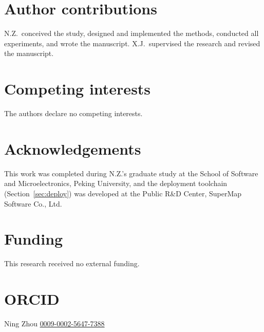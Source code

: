 \documentclass[11pt]{article}
\begin{document}
\section*{Author contributions}
N.Z.\ conceived the study, designed and implemented the methods, conducted all experiments, and wrote the manuscript. X.J.\ supervised the research and revised the manuscript.

\section*{Competing interests}
The authors declare no competing interests.

\section*{Acknowledgements}
This work was completed during N.Z.'s graduate study at the School of Software and Microelectronics, Peking University, and the deployment toolchain (Section~\ref{sec:deploy}) was developed at the Public R\&D Center, SuperMap Software Co., Ltd.

\section*{Funding}
This research received no external funding.

\section*{ORCID}
Ning Zhou \href{https://orcid.org/0009-0002-5647-7388}{0009-0002-5647-7388}


\end{document}
